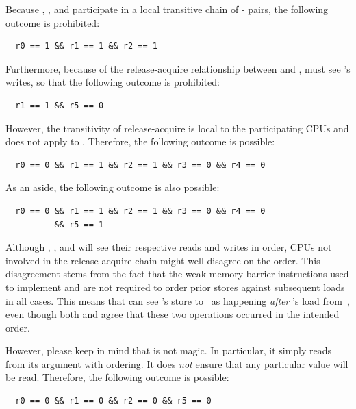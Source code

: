 \begin{enumerate}
Because , , and  participate in a local transitive
chain of - pairs, the following
outcome is prohibited:

{\scriptsize
\begin{verbatim}
  r0 == 1 && r1 == 1 && r2 == 1
\end{verbatim}
}

Furthermore, because of the release-acquire relationship between 
and ,  must see 's writes, so that the following
outcome is prohibited:

{\scriptsize
\begin{verbatim}
  r1 == 1 && r5 == 0
\end{verbatim}
}

However, the transitivity of release-acquire is local to the participating
CPUs and does not apply to .  Therefore, the following outcome
is possible:

{\scriptsize
\begin{verbatim}
  r0 == 0 && r1 == 1 && r2 == 1 && r3 == 0 && r4 == 0
\end{verbatim}
}

As an aside, the following outcome is also possible:

{\scriptsize
\begin{verbatim}
  r0 == 0 && r1 == 1 && r2 == 1 && r3 == 0 && r4 == 0
          && r5 == 1
\end{verbatim}
}

Although , , and  will see their respective reads and
writes in order, CPUs not involved in the release-acquire chain might
well disagree on the order.  This disagreement stems from the fact that
the weak memory-barrier instructions used to implement 
and  are not required to order prior stores against
subsequent loads in all cases.  This means that  can see 's
store to~ as happening {\em after} 's load from~, even though
both  and  agree that these two operations occurred in the
intended order.

However, please keep in mind that  is not magic.
In particular, it simply reads from its argument with ordering.  It does
{\em not} ensure that any particular value will be read.  Therefore, the
following outcome is possible:

{\scriptsize
\begin{verbatim}
  r0 == 0 && r1 == 0 && r2 == 0 && r5 == 0
\end{verbatim}
}


\end{enumerate}
